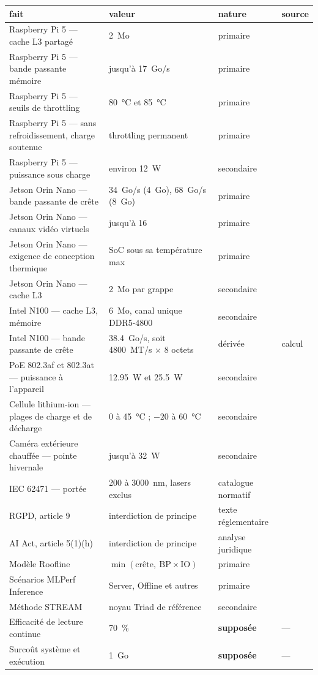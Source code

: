 \documentclass[11pt,a4paper]{article}
\begin{document}
\begin{small}
\begin{longtable}{@{}>{\raggedright}p{5.7cm}>{\raggedright}p{4.1cm}ll@{}}
\toprule
fait & valeur & nature & source \\
\midrule
\endhead
Raspberry Pi 5 — cache L3 partagé & 2~Mo & primaire & \cite{rpidoc} \\
Raspberry Pi 5 — bande passante mémoire & jusqu'à 17~Go/s & primaire & \cite{rpidoc} \\
Raspberry Pi 5 — seuils de throttling & \SI{80}{\celsius} et \SI{85}{\celsius} & primaire & \cite{rpiheat} \\
Raspberry Pi 5 — sans refroidissement, charge soutenue & throttling permanent & primaire & \cite{rpiheat} \\
Raspberry Pi 5 — puissance sous charge & environ 12~W & secondaire & \cite{nbrpi} \\
Jetson Orin Nano — bande passante de crête & 34~Go/s (4~Go), 68~Go/s (8~Go) & primaire & \cite{nvds} \\
Jetson Orin Nano — canaux vidéo virtuels & jusqu'à 16 & primaire & \cite{nvds} \\
Jetson Orin Nano — exigence de conception thermique & SoC sous sa température max & primaire & \cite{nvtdg} \\
Jetson Orin Nano — cache L3 & 2~Mo par grappe & secondaire & \cite{ridgerun} \\
Intel N100 — cache L3, mémoire & 6~Mo, canal unique DDR5-4800 & secondaire & \cite{nbcheck} \\
Intel N100 — bande passante de crête & \num{38,4}~Go/s, soit \num{4800}~MT/s × 8 octets & dérivée & calcul \\
PoE 802.3af et 802.3at — puissance à l'appareil & \num{12,95}~W et \num{25,5}~W & secondaire & \cite{poe} \\
Cellule lithium-ion — plages de charge et de décharge & 0 à \SI{45}{\celsius} ; $-20$ à \SI{60}{\celsius} & secondaire & \cite{bu410} \\
Caméra extérieure chauffée — pointe hivernale & jusqu'à 32~W & secondaire & \cite{ampcom} \\
IEC 62471 — portée & 200 à \num{3000}~nm, lasers exclus & catalogue normatif & \cite{iec62471} \\
RGPD, article 9 & interdiction de principe & texte réglementaire & \cite{gdpr} \\
AI Act, article 5(1)(h) & interdiction de principe & analyse juridique & \cite{aiact} \\
Modèle Roofline & $\min(\text{crête},\ \text{BP} \times \text{IO})$ & primaire & \cite{roofline} \\
Scénarios MLPerf Inference & Server, Offline et autres & primaire & \cite{mlperf} \\
Méthode STREAM & noyau Triad de référence & secondaire & \cite{stream} \\
Efficacité de lecture continue & \SI{70}{\percent} & \textbf{supposée} & — \\
Surcoût système et exécution & 1~Go & \textbf{supposée} & — \\
\bottomrule
\end{longtable}
\end{small}
\end{document}
